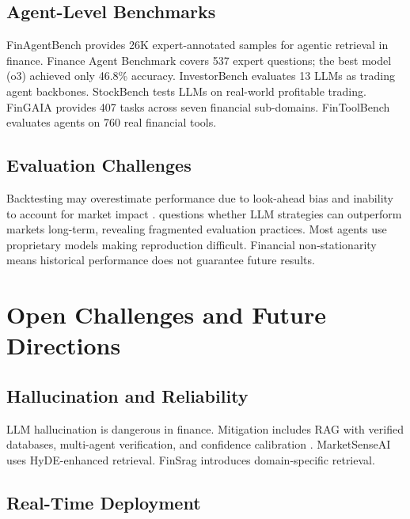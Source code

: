 \documentclass[12pt]{report}
\begin{document}
\section{Agent-Level Benchmarks}

FinAgentBench \citep{choi2025finagentbench} provides 26K expert-annotated samples for agentic retrieval in finance. Finance Agent Benchmark \citep{bigeard2025financeagentbench} covers 537 expert questions; the best model (o3) achieved only 46.8\% accuracy. InvestorBench \citep{li2024investorbench} evaluates 13 LLMs as trading agent backbones. StockBench \citep{chen2025stockbench} tests LLMs on real-world profitable trading. FinGAIA \citep{fingaia2025} provides 407 tasks across seven financial sub-domains. FinToolBench \citep{fintoolbench2026} evaluates agents on 760 real financial tools.

\section{Evaluation Challenges}

Backtesting may overestimate performance due to look-ahead bias and inability to account for market impact \citep{liu2022finrlmeta}. \citet{li2025canllmoutperform} questions whether LLM strategies can outperform markets long-term, revealing fragmented evaluation practices. Most agents use proprietary models making reproduction difficult. Financial non-stationarity means historical performance does not guarantee future results.


\chapter{Open Challenges and Future Directions}

\section{Hallucination and Reliability}

LLM hallucination is dangerous in finance. Mitigation includes RAG with verified databases, multi-agent verification, and confidence calibration \citep{ji2023survey}. MarketSenseAI \citep{fatouros2025marketsenseai} uses HyDE-enhanced retrieval. FinSrag \citep{xiao2025finsrag} introduces domain-specific retrieval.

\section{Real-Time Deployment}
\end{document}
